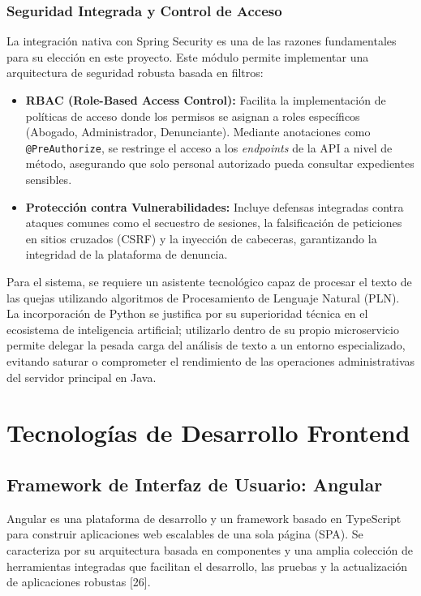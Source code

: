 \subsubsection{Seguridad Integrada y Control de Acceso}

La integración nativa con Spring Security es una de las razones fundamentales para su elección en este proyecto. Este módulo permite implementar una arquitectura de seguridad robusta basada en filtros:
\begin{itemize}
    \item \textbf{RBAC (Role-Based Access Control):} Facilita la implementación de políticas de acceso donde los permisos se asignan a roles específicos (Abogado, Administrador, Denunciante). Mediante anotaciones como \texttt{@PreAuthorize}, se restringe el acceso a los \textit{endpoints} de la API a nivel de método, asegurando que solo personal autorizado pueda consultar expedientes sensibles.
    \item \textbf{Protección contra Vulnerabilidades:} Incluye defensas integradas contra ataques comunes como el secuestro de sesiones, la falsificación de peticiones en sitios cruzados (CSRF) y la inyección de cabeceras, garantizando la integridad de la plataforma de denuncia.
\end{itemize}



Para el sistema, se requiere un asistente tecnológico capaz de procesar el texto de las quejas utilizando algoritmos de Procesamiento de Lenguaje Natural (PLN). La incorporación de Python se justifica por su superioridad técnica en el ecosistema de inteligencia artificial; utilizarlo dentro de su propio microservicio permite delegar la pesada carga del análisis de texto a un entorno especializado, evitando saturar o comprometer el rendimiento de las operaciones administrativas del servidor principal en Java.
\section{Tecnologías de Desarrollo Frontend}
\subsection{Framework de Interfaz de Usuario: Angular}
Angular es una plataforma de desarrollo y un framework basado en TypeScript para construir aplicaciones web escalables de una sola página (SPA). Se caracteriza por su arquitectura basada en componentes y una amplia colección de herramientas integradas que facilitan el desarrollo, las pruebas y la actualización de aplicaciones robustas [26].

